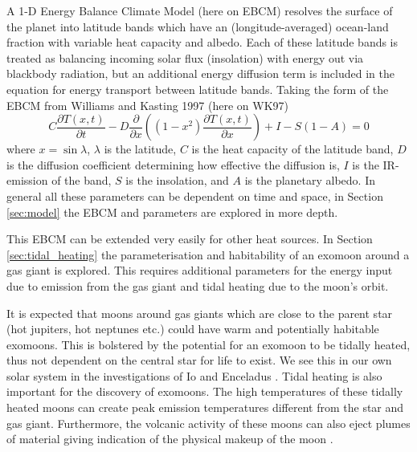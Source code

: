 \documentclass[12pt, onecolumn]{revtex4-2}    %
\begin{document}
A 1-D Energy Balance Climate Model (here on EBCM) resolves the surface of the planet into latitude bands which have an (longitude-averaged) ocean-land fraction with variable heat capacity and albedo.
Each of these latitude bands is treated as balancing incoming solar flux (insolation) with energy out via blackbody radiation, but an additional energy diffusion term is included in the equation for energy transport between latitude bands.
Taking the form of the EBCM from Williams and Kasting 1997 (here on WK97)
\begin{equation}
    C\frac{\partial T(x, t)}{\partial t} - D \frac{\partial}{\partial x} \left((1-x^2)\frac{\partial T(x, t)}{\partial x}\right) + I - S(1-A) = 0
    \label{eq:PDE_in_x}
\end{equation}
where $x=\sin\lambda$, $\lambda$ is the latitude, $C$ is the heat capacity of the latitude band,
$D$ is the diffusion coefficient determining how effective the diffusion is, $I$ is the IR-emission of the band,
$S$ is the insolation, and $A$ is the planetary albedo.
In general all these parameters can be dependent on time and space, in Section \ref{sec:model} the EBCM and parameters are explored in more depth.

This EBCM can be extended very easily for other heat sources.
In Section \ref{sec:tidal_heating} the parameterisation and habitability of an exomoon around a gas giant is explored.
This requires additional parameters for the energy input due to emission from the gas giant and tidal heating due to the moon's orbit.

It is expected that moons around gas giants which are close to the parent star (hot jupiters, hot neptunes etc.) could have warm and potentially habitable exomoons.
This is bolstered by the potential for an exomoon to be tidally heated, thus not dependent on the central star for life to exist.
We see this in our own solar system in the investigations of Io and Enceladus \cite{SAB22}.
Tidal heating is also important for the discovery of exomoons.
The high temperatures of these tidally heated moons can create peak emission temperatures different from the star and gas giant.
Furthermore, the volcanic activity of these moons can also eject plumes of material giving indication of the physical makeup of the moon \cite{RN21}.
\end{document}
